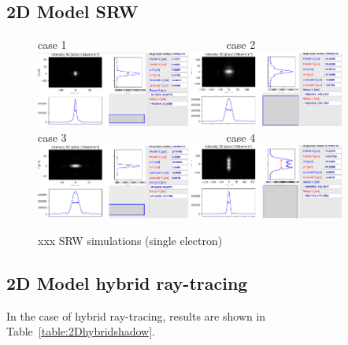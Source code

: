 \documentclass{iucr}              %
\begin{document}
\subsection{2D Model SRW}

\begin{figure}\label{fig:srw}
    \centering
    case 1~~~~~~~~~~~~~~~~~~~~~~~~~~~~~case 2\\
    \includegraphics[width=0.45\textwidth]{figures/case1_srw.png}
    \includegraphics[width=0.45\textwidth]{figures/case2_srw.png}\\
    case 3~~~~~~~~~~~~~~~~~~~~~~~~~~~~~case 4\\
    \includegraphics[width=0.45\textwidth]{figures/case3_srw.png}
    \includegraphics[width=0.45\textwidth]{figures/case4_srw.png}
    \caption{xxx SRW simulations (single electron)}
\end{figure}


\subsection{2D Model hybrid ray-tracing}
In the case of hybrid ray-tracing, results are shown in Table~\ref{table:2Dhybridshadow}. 
\end{document}
